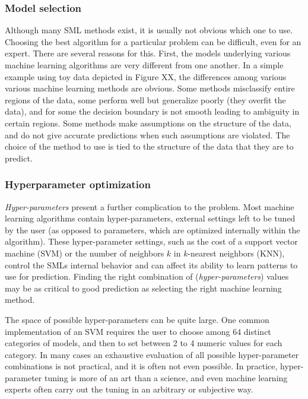 

\subsubsection{Model selection}

Although many SML methods exist, it is usually not obvious which one to use. Choosing the best algorithm for a particular problem can be difficult, even for an expert. There are several reasons for this. First, the models underlying various machine learning algorithms are very different from one another. In a simple example using toy data depicted in Figure XX, the differences among various various machine learning methods are obvious. Some methods misclassify entire regions of the data, some perform well but generalize poorly (they overfit the data), and for some the decision boundary is not smooth leading to ambiguity in certain regions.  Some methods make assumptions on the structure of the data, and do not give accurate predictions when such assumptions are violated. The choice of the method to use is tied to the structure of the data that they are to predict.




\subsubsection{Hyperparameter optimization}

\emph{Hyper-parameters} present a further complication to the problem. Most machine learning algorithms contain hyper-parameters, external settings left to be tuned by the user (as opposed to parameters, which are optimized internally within the algorithm). These hyper-parameter settings, such as the cost of a support vector machine (SVM) or the number of neighbors $k$ in $k$-nearest neighbors (KNN), control the SMLs internal behavior and can affect its ability to  learn patterns to use for prediction. Finding the right combination of (\emph{hyper-parameters}) values may be as critical to good prediction as selecting the right machine learning method.

The space of possible hyper-parameters can be quite large. One common implementation of an SVM requires the user to choose among 64 distinct categories of models, and then to set between 2 to 4 numeric values for each category. In many cases an exhaustive evaluation of all possible hyper-parameter combinations is not practical, and it is often not even possible. In practice, hyper-parameter tuning is more of an art than a science, and even machine learning experts often carry out the tuning in an arbitrary or subjective way.


